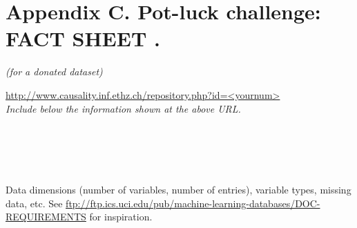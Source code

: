 \documentclass[twoside,11pt]{article}
\begin{document}
\section*{Appendix C. Pot-luck challenge: FACT SHEET .}
\label{sec:factsheet_v2}

{\begin{center} \em (for a donated dataset)\\ \end{center}}

  \url{http://www.causality.inf.ethz.ch/repository.php?id=<yournum>}\\

{\noindent \em Include below the information shown at the above URL.}\\

 \\

 \\
 \\
 \\

 \\
Data dimensions (number of variables, number of entries), variable types, missing data, etc. See \url{ftp://ftp.ics.uci.edu/pub/machine-learning-databases/DOC-REQUIREMENTS} for inspiration.\\

 \\

 \\

\vskip 0.2in

\end{document}
